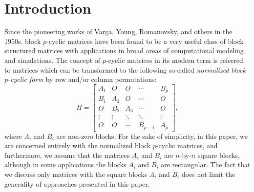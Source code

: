 \documentclass{llncs}
\begin{document}
\section{Introduction}

Since the pioneering works of
Varga, Young, Romanovsky, and others in the 1950s. %
block $p$-cyclic matrices
have been found to be a very useful class of block structured matrices
with applications in broad areas of computational modeling and
simulations. The concept of $p$-cyclic matrices
in its modern term is referred to matrices which can be
transformed to the following so-called \emph{normalized block $p$-cyclic form} 
by row and/or column permutations: 
\begin{equation} \label{eq:matr_A}
  H =
  \begin{bmatrix}
    A_1 &  O  &  O  & \cdots & B_p   \\
    B_1 & A_2 &  O  & \cdots &  O    \\
    O   & B_2 & A_3 & \cdots &  O    \\
    \vdots  & \vdots & \ddots & \ddots & \vdots  \\
    O   & O   &  \cdots  & B_{p-1} & A_p
  \end{bmatrix}
  ,
\end{equation}
where $A_i$ and $B_i$ are non-zero blocks.
For the sake of simplicity, in this paper,
we are concerned entirely with the {normalized block $p$-cyclic matrices},
and furthermore, we assume that the matrices
$A_i$ and $B_i$ are $n$-by-$n$ square blocks, although
in some applications the blocks $A_i$ and $B_i$ are rectangular.
The fact that we discuss only matrices with the square blocks $A_i$ and $B_i$
does not limit the generality of approaches presented in this paper.
\end{document}
